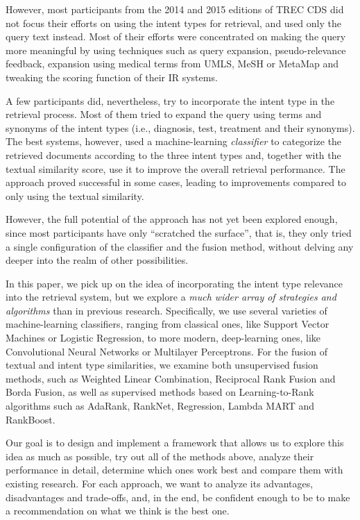 However, most participants from the 2014 and 2015 editions of TREC CDS did not focus their efforts on using the intent types for retrieval,
and used only the query text instead. Most of their efforts were concentrated on making the query more meaningful by using techniques
such as query expansion, pseudo-relevance feedback, expansion using medical terms from UMLS, MeSH or MetaMap and tweaking
the scoring function of their IR systems.

A few participants did, nevertheless, try to incorporate the intent type in the retrieval process. Most of them
tried to expand the query using terms and synonyms of the intent types (i.e., diagnosis, test, treatment and their synonyms).
The best systems, however, used a machine-learning \emph{classifier} to categorize the retrieved documents according
to the three intent types and, together with the textual similarity score, use it to improve the overall retrieval performance.
The approach proved successful in some cases, leading to improvements compared to only using the textual similarity.

However, the full potential of the approach has not yet been explored enough,
since most participants have only ``scratched the surface'', that is, they only tried a single configuration of
the classifier and the fusion method, without delving any deeper into the realm of other possibilities.

In this paper, we pick up on the idea of incorporating the intent type relevance into the retrieval system,
but we explore a \emph{much wider array of strategies and algorithms} than in previous research. Specifically,
we use several varieties of machine-learning classifiers, ranging from classical ones, like Support Vector Machines or
Logistic Regression, to more modern, deep-learning ones, like Convolutional Neural Networks or Multilayer Perceptrons.
For the fusion of textual and intent type similarities,
we examine both unsupervised fusion methods, such as Weighted Linear Combination, Reciprocal Rank Fusion and Borda Fusion,
as well as supervised methods based
on Learning-to-Rank algorithms such as AdaRank, RankNet, Regression, Lambda MART and RankBoost.

Our goal is to design and implement a framework that allows us
to explore this idea as much as possible, try out all of the methods above, 
analyze their performance in detail,
determine which ones work best and compare them with existing research.
For each approach, we want to analyze its advantages, disadvantages and trade-offs,
and, in the end, be confident enough to be to make a recommendation on what we think is the best one.

